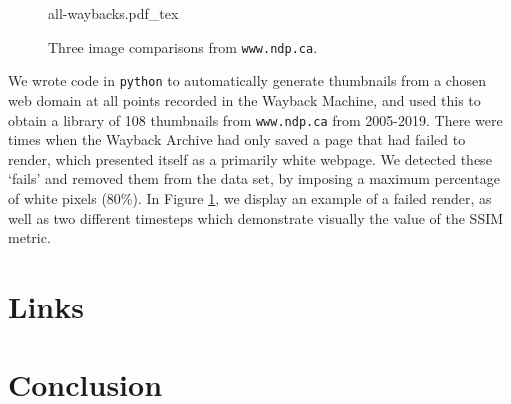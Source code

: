 \documentclass[10pt, a4paper]{article}
\begin{document}
\begin{figure}[h!]
\centering
\def\svgwidth{
0.7\columnwidth}
{all-waybacks.pdf_tex}
  \caption{Three image comparisons from \texttt{www.ndp.ca}.}
\label{fig::wayback_images}
\end{figure}

We wrote code in \texttt{python} to automatically generate thumbnails from a chosen web domain at all points recorded in the Wayback Machine, and used this to obtain a library of 108 thumbnails from \texttt{www.ndp.ca} from 2005-2019. There were times when the Wayback Archive had only saved a page that had failed to render, which presented itself as a primarily white webpage. We detected these `fails' and removed them from the data set, by imposing a maximum percentage of white pixels (80\%). In Figure \ref{fig::wayback_images}, we display an example of a failed render, as well as two different timesteps which demonstrate visually the value of the SSIM metric.

\section{Links}

\section{Conclusion}



\end{document}
